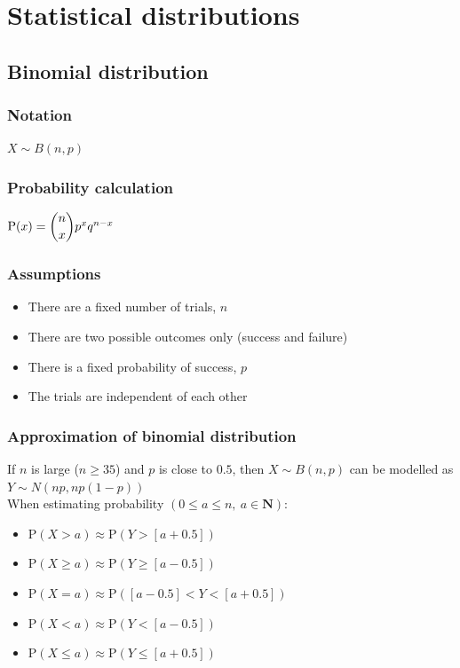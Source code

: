 \documentclass[A4paper, 11pt]{article}
\begin{document}
	\pagebreak
	
	\section{Statistical distributions}
	\subsection{Binomial distribution}
	\subsubsection{Notation}
	$X \sim B(n,p)$
	\subsubsection{Probability calculation}
	$\text{P}(x) = \dbinom{n}{x} p^x q^{n-x}$
	\subsubsection{Assumptions}
	\begin{itemize}
		\item There are a fixed number of trials, $n$
		\item There are two possible outcomes only (success and failure)
		\item There is a fixed probability of success, $p$
		\item The trials are independent of each other
	\end{itemize}
	\subsubsection{Approximation of binomial distribution}
	If $n$ is large ($n\geq35$) and $p$ is close to $0.5$, then $X \sim B(n,p)$ can be modelled as $Y \sim N(np, np(1-p))$\\
	When estimating probability $(0\leq a \leq n, \: a \in \textbf{N})$:
	\begin{itemize}
		\item $\text{P}(X>a)\approx \text{P}(Y>[a+0.5])$
		\item $\text{P}(X\geq a)\approx \text{P}(Y\geq [a-0.5])$
		\item $\text{P}(X=a)\approx \text{P}([a-0.5]<Y<[a+0.5])$
		\item $\text{P}(X<a)\approx \text{P}(Y<[a-0.5])$
		\item $\text{P}(X \leq a)\approx \text{P}(Y\leq [a+0.5])$
	\end{itemize}
	
\end{document}
